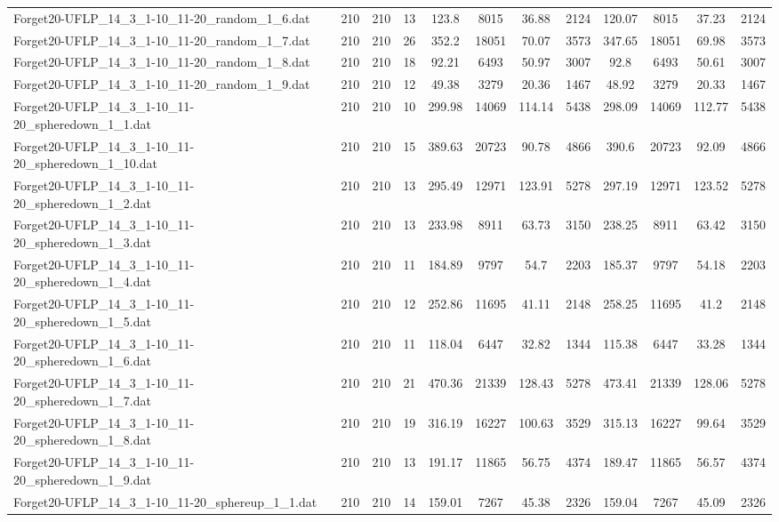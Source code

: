 \begin{sidewaystable}[!ht]
{\begin{tabular}{lccccccccccc}
Forget20-UFLP\_14\_3\_1-10\_11-20\_random\_1\_6.dat & 210 & 210 & 13 & 123.8 & 8015 & 36.88 & 2124 & 120.07 & 8015 & 37.23 & 2124 \\
Forget20-UFLP\_14\_3\_1-10\_11-20\_random\_1\_7.dat & 210 & 210 & 26 & 352.2 & 18051 & 70.07 & 3573 & 347.65 & 18051 & 69.98 & 3573 \\
Forget20-UFLP\_14\_3\_1-10\_11-20\_random\_1\_8.dat & 210 & 210 & 18 & 92.21 & 6493 & 50.97 & 3007 & 92.8 & 6493 & 50.61 & 3007 \\
Forget20-UFLP\_14\_3\_1-10\_11-20\_random\_1\_9.dat & 210 & 210 & 12 & 49.38 & 3279 & 20.36 & 1467 & 48.92 & 3279 & 20.33 & 1467 \\
Forget20-UFLP\_14\_3\_1-10\_11-20\_spheredown\_1\_1.dat & 210 & 210 & 10 & 299.98 & 14069 & 114.14 & 5438 & 298.09 & 14069 & 112.77 & 5438 \\
Forget20-UFLP\_14\_3\_1-10\_11-20\_spheredown\_1\_10.dat & 210 & 210 & 15 & 389.63 & 20723 &  \textcolor{blue2}{90.78} & 4866 & 390.6 & 20723 & 92.09 & 4866 \\
Forget20-UFLP\_14\_3\_1-10\_11-20\_spheredown\_1\_2.dat & 210 & 210 & 13 & 295.49 & 12971 & 123.91 & 5278 & 297.19 & 12971 & 123.52 & 5278 \\
Forget20-UFLP\_14\_3\_1-10\_11-20\_spheredown\_1\_3.dat & 210 & 210 & 13 & 233.98 & 8911 & 63.73 & 3150 & 238.25 & 8911 & 63.42 & 3150 \\
Forget20-UFLP\_14\_3\_1-10\_11-20\_spheredown\_1\_4.dat & 210 & 210 & 11 & 184.89 & 9797 & 54.7 & 2203 & 185.37 & 9797 & 54.18 & 2203 \\
Forget20-UFLP\_14\_3\_1-10\_11-20\_spheredown\_1\_5.dat & 210 & 210 & 12 & 252.86 & 11695 & 41.11 & 2148 & 258.25 & 11695 & 41.2 & 2148 \\
Forget20-UFLP\_14\_3\_1-10\_11-20\_spheredown\_1\_6.dat & 210 & 210 & 11 & 118.04 & 6447 & 32.82 & 1344 & 115.38 & 6447 & 33.28 & 1344 \\
Forget20-UFLP\_14\_3\_1-10\_11-20\_spheredown\_1\_7.dat & 210 & 210 & 21 & 470.36 & 21339 & 128.43 & 5278 & 473.41 & 21339 &  \textcolor{blue2}{128.06} & 5278 \\
Forget20-UFLP\_14\_3\_1-10\_11-20\_spheredown\_1\_8.dat & 210 & 210 & 19 & 316.19 & 16227 & 100.63 & 3529 & 315.13 & 16227 & 99.64 & 3529 \\
Forget20-UFLP\_14\_3\_1-10\_11-20\_spheredown\_1\_9.dat & 210 & 210 & 13 & 191.17 & 11865 & 56.75 & 4374 & 189.47 & 11865 & 56.57 & 4374 \\
Forget20-UFLP\_14\_3\_1-10\_11-20\_sphereup\_1\_1.dat & 210 & 210 & 14 & 159.01 & 7267 & 45.38 & 2326 & 159.04 & 7267 & 45.09 & 2326 \\

\end{tabular}}
\end{sidewaystable}
